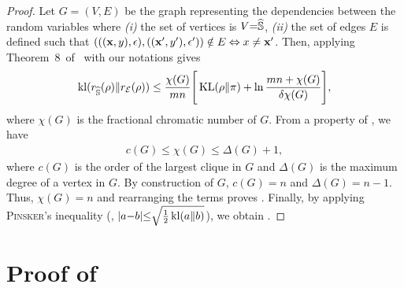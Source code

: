 \begin{noaddcontents}
\theoremchromatic*
\begin{proof}
Let $G{=}(V, E)$ be the graph representing the dependencies between the random variables where 
{\it (i)} the set of vertices is $V {=} \widehat{\mathbb{S}}$, {\it (ii)} the set of edges $E$ is defined such that \mbox{$(((\mathbf{x}, y), \epsilon), ((\mathbf{x}', y'), \epsilon')) \notin E \Leftrightarrow x \ne \mathbf{x}'$}.
Then, applying Theorem~8~of~\citet{RalaivolaSzafranskiStempfel2010} with our notations gives
\begin{align*}
    \operatorname{kl}(r_{\widehat{\mathbb{S}}}(\rho)\|r_{{\mathcal{E}}}(\rho)) \le \frac{\chi({G})}{mn} \Bigg[\operatorname{KL}(\rho\|\pi) + \ln \frac{mn+\chi({G})}{\delta\chi({G})}
     \Bigg],
\end{align*}
where $\chi(G)$ is the fractional chromatic number of $G$.
From a property of \citet{ScheinermanUllman2011}, we have
\begin{align*}
    c(G) \le \chi(G) \le \Delta(G)+1,
\end{align*}
where $c(G)$ is the order of the largest clique in $G$ and $\Delta(G)$ is the maximum degree of a vertex in $G$.
By construction of $G$, $c(G){=}n$ and $\Delta(G){=}n{-}1$. 
Thus, $\chi(G){=}n$ and rearranging the terms proves  .
Finally, by applying \textsc{Pinsker}'s inequality (\ie, $|a{-}b|{\le} \sqrt{\tfrac{1}{2}\operatorname{kl}(a\|b)}$), we obtain .
\end{proof}

\section{Proof of }
\label{ap:mv-robustness:sec:proof-bound-average-max}


\end{noaddcontents}
